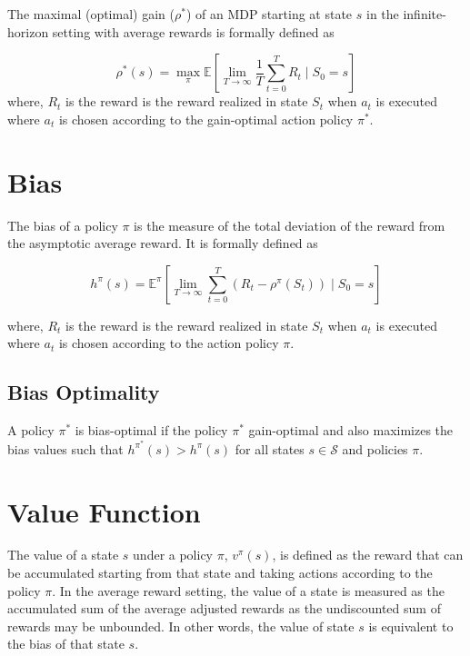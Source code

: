 The maximal (optimal) gain ($\rho^*$) of an MDP starting at state $s$ in the infinite-horizon setting with average rewards is formally defined as

\begin{equation}
    \label{eqn:gain_opt}
    \rho^*(s) = \max_\pi \mathbb{E}\left[\lim_{T \to \infty} \frac{1}{T} \sum_{t=0}^{T} R_t \mid S_0 = s\right]
\end{equation}
where, $R_t$ is the reward is the reward realized in state $S_t$ when $a_t$ is executed where $a_t$ is chosen according to the gain-optimal action policy $\pi^*$.

\section{Bias}

The bias of a policy $\pi$ is the measure of the total deviation of the reward from the asymptotic average reward.
It is formally defined as

\begin{equation}
    \label{eqn:bias}
    h^\pi(s) = \mathbb{E}^\pi\left[\lim_{T \to \infty} \sum_{t=0}^{T} (R_t - \rho^\pi(S_t)) \mid S_0 = s\right]
\end{equation}

where, $R_t$ is the reward is the reward realized in state $S_t$ when $a_t$ is executed where $a_t$ is chosen according to the action policy $\pi$.

\subsection*{Bias Optimality}

A policy $\pi^*$ is bias-optimal if the policy $\pi^*$ gain-optimal and also maximizes the bias values such that $h^{\pi^*} (s) > h^\pi(s)$ for all states $s \in \mathcal{S}$ and policies $\pi$.

\section{Value Function}

The value of a state $s$ under a policy $\pi$, $v^\pi(s)$, is defined as the reward that can be accumulated starting from that state and taking actions according to the policy $\pi$. 
In the average reward setting, the value of a state is measured as the accumulated sum of the average adjusted rewards as the undiscounted sum of rewards may be unbounded.
In other words, the value of state $s$ is equivalent to the bias of that state $s$.

